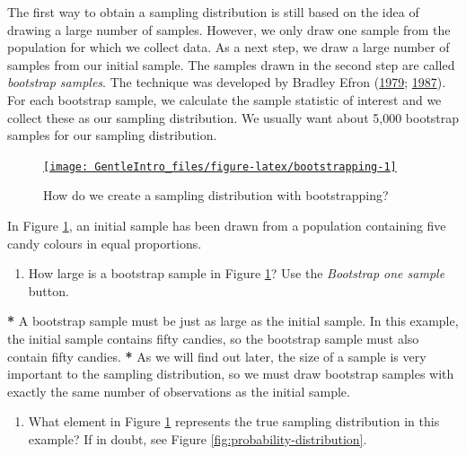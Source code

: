 \documentclass[a4paper]{book}
\newenvironment{Shaded}{\begin{snugshade}}{\end{snugshade}}
\newcommand{\StringTok}[1]{\textcolor[rgb]{0.00,0.00,0.00}{#1}}
\newcommand{\OperatorTok}[1]{\textcolor[rgb]{0.00,0.00,0.00}{\textbf{#1}}}
\newcommand{\NormalTok}[1]{#1}
\providecommand{\tightlist}{%
  \setlength{\itemsep}{0pt}\setlength{\parskip}{0pt}}
\theoremstyle{definition}
\theoremstyle{definition}
\theoremstyle{definition}
\theoremstyle{remark}
\begin{document}
The first way to obtain a sampling distribution is still based on the
idea of drawing a large number of samples. However, we only draw one
sample from the population for which we collect data. As a next step, we
draw a large number of samples from our initial sample. The samples
drawn in the second step are called \emph{bootstrap samples}. The
technique was developed by Bradley Efron
(\protect\hyperlink{ref-RefWorks:3956}{1979};
\protect\hyperlink{ref-RefWorks:3957}{1987}). For each bootstrap sample,
we calculate the sample statistic of interest and we collect these as
our sampling distribution. We usually want about 5,000 bootstrap samples
for our sampling distribution.

\begin{figure}[H]
\href{http://82.196.4.233:3838/apps/bootstrapping/}{\texttt{[image: GentleIntro\_files/figure-latex/bootstrapping-1]} }\caption{How do we create a sampling distribution with bootstrapping?}\label{fig:bootstrapping}
\end{figure}

In Figure \ref{fig:bootstrapping}, an initial sample has been drawn from
a population containing five candy colours in equal proportions.

\begin{enumerate}
\def\labelenumi{\arabic{enumi}.}
\tightlist
\item
  How large is a bootstrap sample in Figure \ref{fig:bootstrapping}? Use
  the \emph{Bootstrap one sample} button.
\end{enumerate}

\begin{Shaded}
\begin{Highlighting}[]
\OperatorTok{*}\StringTok{ }\NormalTok{A bootstrap sample must be just as large as the initial sample. In this}
\NormalTok{example, the initial sample contains fifty candies, so the bootstrap sample}
\NormalTok{must also contain fifty candies.}
\OperatorTok{*}\StringTok{ }\NormalTok{As we will find out later, the size of a sample is very important to the}
\NormalTok{sampling distribution, so we must draw bootstrap samples with exactly the same}
\NormalTok{number of observations as the initial sample.}
\end{Highlighting}
\end{Shaded}

\begin{enumerate}
\def\labelenumi{\arabic{enumi}.}
\setcounter{enumi}{1}
\tightlist
\item
  What element in Figure \ref{fig:bootstrapping} represents the true
  sampling distribution in this example? If in doubt, see Figure
  \ref{fig:probability-distribution}.
\end{enumerate}
\end{document}

